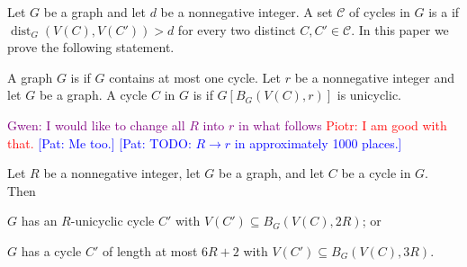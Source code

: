\documentclass{patmorin}
\newcommand{\pat}[1]{\textcolor{Blue}{[Pat: #1]}}
\newcommand{\gwen}[1]{\textcolor{Purple}{Gwen: #1}}
\newcommand{\piotr}[1]{\textcolor{red}{Piotr: #1}}
\DeclareMathOperator{\dist}{dist}
\begin{document}
Let $G$ be a graph and let $d$ be a nonnegative integer.
A set $\mathcal{C}$ of cycles in $G$ is a  if $\dist_G(V(C),V(C'))> d$ for every two distinct $C,C'\in\mathcal{C}$.
In this paper we prove the following statement.


A graph $G$ is  if $G$ contains at most one cycle.  Let $r$ be a nonnegative integer and let $G$ be a graph.
A cycle $C$ in $G$ is 
if $G[B_G(V(C),r)]$ is unicyclic.

\gwen{I would like to change all $R$ into $r$ in what follows}
\piotr{I am good with that.} \pat{Me too.} \pat{TODO: $R\to r$ in approximately 1000 places.}

\begin{lem}\label{short_or_unicycle_nearby}
  Let $R$ be a nonnegative integer, let $G$ be a graph, and let $C$ be a cycle in $G$.
  Then 
  \begin{tightenum}%
    \item $G$ has an $R$-unicyclic cycle $C'$ with $V(C')\subseteq B_G(V(C),2R)$; or\label{short_or_unicycle_nearby:unicyclic}     
    \item $G$ has a cycle $C'$ of length at most $6R+2$ with $V(C')\subseteq B_G(V(C),3R)$.\label{short_or_unicycle_nearby:short}     
  \end{tightenum}
\end{lem}
\end{document}
